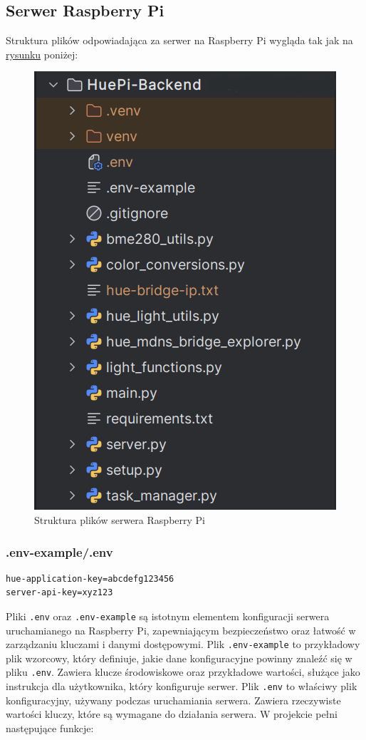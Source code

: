 \documentclass[12pt]{article}
\begin{document}
\subsection{Serwer Raspberry Pi}
Struktura plików odpowiadająca za serwer na Raspberry Pi wygląda tak jak na \hyperlink{fig:struktura-plików-raspberry}{rysunku} poniżej:
\begin{figure}[H]
    \centering
    \hypertarget{fig:struktura-plików-raspberry}{}
    \includegraphics[scale=0.8]{figures/struktura-plikow-raspberry-pi.png}
    \caption{Struktura plików serwera Raspberry Pi}
    \label{fig:struktura-plików-raspberry}
\end{figure}

\subsubsection{.env-example/.env}
\begin{lstlisting}
hue-application-key=abcdefg123456
server-api-key=xyz123
\end{lstlisting}

Pliki \texttt{.env} oraz \texttt{.env-example} są istotnym elementem konfiguracji serwera uruchamianego na Raspberry Pi, zapewniającym bezpieczeństwo oraz łatwość
w zarządzaniu kluczami i danymi dostępowymi. Plik \texttt{.env-example} to przykładowy plik wzorcowy, który definiuje, jakie dane konfiguracyjne powinny znaleźć się
w pliku \texttt{.env}. Zawiera klucze środowiskowe oraz przykładowe wartości, służące jako instrukcja dla użytkownika, który konfiguruje serwer. Plik \texttt{.env}
to właściwy plik konfiguracyjny, używany podczas uruchamiania serwera. Zawiera rzeczywiste wartości kluczy, które są wymagane do działania serwera. W projekcie pełni
następujące funkcje:
\end{document}
